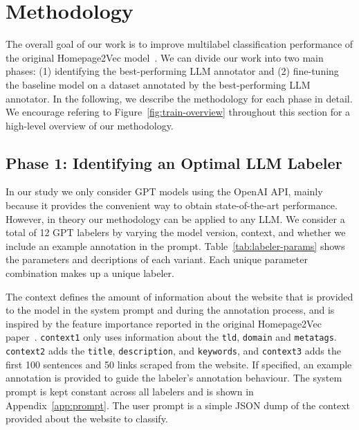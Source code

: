 \section{Methodology}\label{sec:methodology}

The overall goal of our work is to improve multilabel classification performance of the original Homepage2Vec model~\cite{homepage2vec}. We can divide our work into two main phases: (1) identifying the best-performing LLM annotator and (2) fine-tuning the baseline model on a dataset annotated by the best-performing LLM annotator. In the following, we describe the methodology for each phase in detail. We encourage refering to Figure~\ref{fig:train-overview} throughout this section for a high-level overview of our methodology.

\subsection*{Phase 1: Identifying an Optimal LLM Labeler}



In our study we only consider GPT models using the OpenAI API, mainly because it provides the convenient way to obtain state-of-the-art performance. However, in theory our methodology can be applied to any LLM. We consider a total of 12 GPT labelers by varying the model version, context, and whether we include an example annotation in the prompt. Table~\ref{tab:labeler-params} shows the parameters and decriptions of each variant. Each unique parameter combination makes up a unique labeler.

The context defines the amount of information about the website that is provided to the model in the system prompt and during the annotation process, and is inspired by the feature importance reported in the original Homepage2Vec paper~\cite{homepage2vec}. \texttt{context1} only uses information about the \texttt{tld}, \texttt{domain} and \texttt{metatags}. \texttt{context2} adds the \texttt{title}, \texttt{description}, and \texttt{keywords}, and \texttt{context3} adds the first 100 sentences and 50 links scraped from the website. If specified, an example annotation is provided to guide the labeler's annotation behaviour. The system prompt is kept constant across all labelers and is shown in Appendix~\ref{app:prompt}. The user prompt is a simple JSON dump of the context provided about the website to classify.

